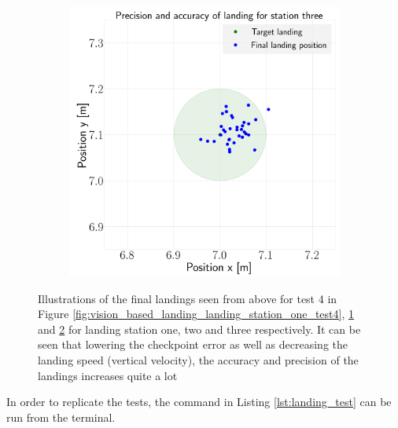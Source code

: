 \documentclass[../Head/report.tex]{subfiles}
\begin{document}
\begin{figure}[H]
\begin{subfigure}[t]{.30\textwidth}
        \caption{}
        \label{fig:vision_based_landing_landing_station_two_test4}
    \end{subfigure}
     \hspace{0.2em}
    \begin{subfigure}[t]{.30\textwidth}
        \centering
        \includegraphics[width=\textwidth]{../Figures/landing_test/test4_speed_0.1_error_0.05/landing_for_station_three.png}
        \caption{}
        \label{fig:vision_based_landing_landing_station_three_test4}
    \end{subfigure}
    \caption{Illustrations of the final landings seen from above for test 4 in Figure \ref{fig:vision_based_landing_landing_station_one_test4}, \ref{fig:vision_based_landing_landing_station_two_test4} and \ref{fig:vision_based_landing_landing_station_three_test4} for landing station one, two and three respectively. It can be seen that lowering the checkpoint error as well as decreasing the landing speed (vertical velocity), the accuracy and precision of the landings increases quite a lot}
    \label{fig:vision_based_landing_test4}
\end{figure}

In order to replicate the tests, the command in Listing \ref{lst:landing_test} can be run from the terminal.
\end{document}
